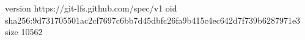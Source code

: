 version https://git-lfs.github.com/spec/v1
oid sha256:9d731705501ac2cf7697c6bb7d45dbfc26fa9b415c4ec642d7f739b6287971e3
size 10562
